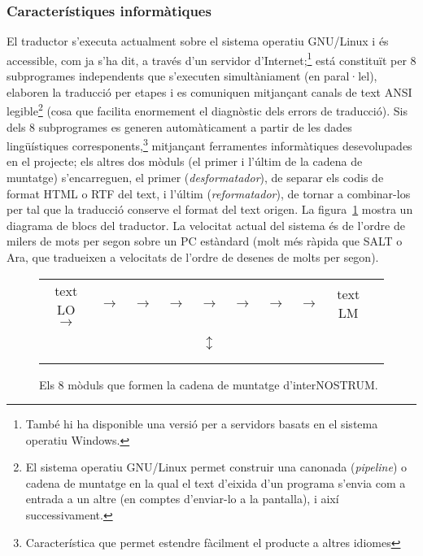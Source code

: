 \subsubsection{Característiques informàtiques}

El traductor s'executa actualment sobre el sistema operatiu GNU/Linux i és
accessible, com ja s'ha dit, a través d'un servidor
d'Internet;\footnote{També hi ha disponible una versió per a servidors
  basats en el sistema operatiu Windows.} está constituït per 8
subprogrames independents que s'executen simultàniament (en
paral·lel), elaboren la traducció per etapes i es comuniquen
mitjançant canals de text ANSI legible\footnote{El sistema operatiu
  GNU/Linux permet construir una canonada (\emph{pipeline}) o cadena de
  muntatge en la qual el text d'eixida d'un programa s'envia com a
  entrada a un altre (en comptes d'enviar-lo a la pantalla), i així
  successivament.} (cosa que facilita enormement el diagnòstic dels
errors de traducció). Sis dels 8 subprogrames es generen
automàticament a partir de les dades lingüístiques
corresponents,\footnote{Característica que permet estendre fàcilment
  el producte a altres idiomes} mitjançant ferramentes informàtiques
desevolupades en el projecte; els altres dos mòduls (el primer i
l'últim de la cadena de muntatge) s'encarreguen, el primer
(\emph{desformatador}), de separar els codis de format HTML o RTF del
text, i l'últim (\emph{reformatador}), de tornar a combinar-los per
tal que la traducció conserve el format del text origen.  La
figura~\ref{fg:modules} mostra un diagrama de blocs del traductor. La
velocitat actual del sistema és de l'ordre de milers de mots per segon
sobre un PC estàndard (molt més ràpida que SALT o Ara, que tradueixen
a velocitats de l'ordre de desenes de molts per segon).

\begin{figure}
{\small
\setlength{\tabcolsep}{0.5mm}
\begin{center}
\begin{tabular}{cccccccccc}
\\
\parbox{0.7cm}{text LO} $\rightarrow$ &
 $\rightarrow$ &
  $\rightarrow$ &
 $\rightarrow$ &  $\rightarrow$ &
$\rightarrow$ & 
$\rightarrow$ &  $\rightarrow$ &
\parbox{0.7cm}{text LM}\\\\
& &  & & $\updownarrow$   & \\\\
& &
 &  &                 &   \\
\end{tabular}
\end{center}
}
\caption{Els 8 mòduls que formen la cadena de muntatge d'interNOSTRUM.}
\label{fg:modules}
\end{figure}


